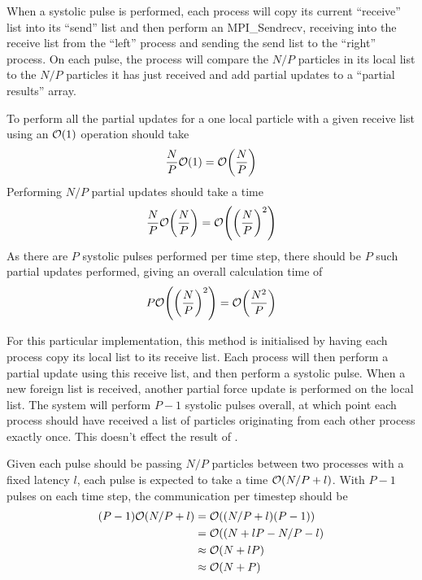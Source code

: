 When a systolic pulse is performed,
each process will copy its current ``receive''
list into its ``send'' list and then perform an MPI\_Sendrecv, receiving
into the receive list from the ``left'' process and sending the send list
to the ``right'' process.
%
On each pulse, the process will compare the $N/P$ particles in its
local list to the $N/P$ particles it has just received and
add partial updates to a ``partial results'' array.

%
To perform all the partial updates for a one local particle
with a given receive list using an $\mathcal{O}{\left({ 1 }\right)}$ operation should take
\begin{equation}
    \frac{N}{P}\mathcal{O}{\left({ 1 }\right)} = \mathcal{O}{\left({ \frac{N}{P} }\right)}
\end  {equation}
%
Performing $N/P$ partial updates should take a time
\begin{equation}
    \frac{N}{P}\mathcal{O}{\left({ \frac{N}{P} }\right)} = \mathcal{O}{\left({ \left( \frac{N}{P} \right)^2 }\right)}
\end  {equation}
%
As there are $P$ systolic pulses performed per time step,
there should be $P$ such partial updates
performed, giving an overall calculation time of
\begin{equation}
    \label{eqn:systolic_loop_pair_operation_overall_time}
    P\mathcal{O}{\left({  \left(\frac{N}{P}\right)^2  }\right)} = \mathcal{O}{\left({ \frac{N^2}{P} }\right)}
\end  {equation}


For this particular implementation,
this method is initialised by having each process
copy its local list to its receive list.
%
Each process will then perform a partial update using this receive
list, and then perform a systolic pulse.
%
When a new foreign list is received, another partial force update
is performed on the local list.
%
The system will perform $P-1$ systolic pulses overall, at which point
each process should have received a list of particles originating
from each other process exactly once.
%
This doesn't effect the result of
.


%
Given each pulse should be passing $N/P$ particles between two processes
with a fixed latency $l$, each pulse is expected to take a time
$\mathcal{O}{\left({ N/P + l }\right)}$.
%
With $P-1$ pulses on each time step, the communication per timestep should be
\begin{equation}
    \begin{split}
        (P-1)\mathcal{O}{\left({ N/P + l }\right)}
            &= \mathcal{O}{\left({ (N/P + l)(P-1) }\right)} \\
            &= \mathcal{O}{\left({ (N + lP - N/P - l }\right)} \\
            &\approx{} \mathcal{O}{\left({ N + lP }\right)} \\
            &\approx{} \mathcal{O}{\left({ N + P }\right)}
    \end{split}
\end{equation}

